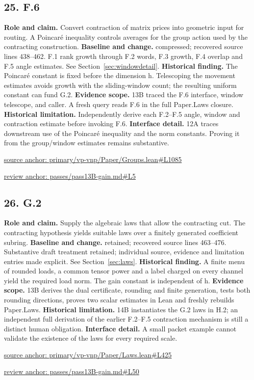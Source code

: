 \documentclass[11pt,letterpaper]{article}
\theoremstyle{definition}\newtheorem{definition}[theorem]{Definition}\newtheorem{example}[theorem]{Example}
\theoremstyle{remark}\newtheorem{remark}[theorem]{Remark}
\begin{document}
\subsection*{25. F.6}
\textbf{Role and claim.} Convert contraction of matrix prices into geometric input for routing. A Poincaré inequality controls averages for the group action used by the contracting construction.
\textbf{Baseline and change.} compressed; recovered source lines 438--462. F.1 rank growth through F.2 words, F.3 growth, F.4 overlap and F.5 angle estimates. See Section~\ref{sec:windowdetail}.
\textbf{Historical finding.} The Poincaré constant is fixed before the dimension h. Telescoping the movement estimates avoids growth with the sliding-window count; the resulting uniform constant can fund G.2.
\textbf{Evidence scope.} 13B traced the F.6 interface, window telescope, and caller. A fresh query reads F.6 in the full Paper.Laws closure.
\textbf{Historical limitation.} Independently derive each F.2–F.5 angle, window and contraction estimate before invoking F.6.
\textbf{Interface detail.} 12A traces downstream use of the Poincaré inequality and the norm constants. Proving it from the group/window estimates remains substantive.
\par\href{https://github.com/nousentllc/VP-VNP-Review/blob/8a7976933b6b2b4ffda1ad3a0dfb5fc6b6f023e8/primary/vp-vnp/Paper/Groups.lean\#L1085}{source anchor: primary/vp-vnp/Paper/Groups.lean\#L1085}
\par\href{https://github.com/nousentllc/VP-VNP-Review/blob/8a7976933b6b2b4ffda1ad3a0dfb5fc6b6f023e8/passes/pass13B-gain.md\#L5}{review anchor: passes/pass13B-gain.md\#L5}
\goodbreak
\subsection*{26. G.2}
\textbf{Role and claim.} Supply the algebraic laws that allow the contracting cut. The contracting hypothesis yields suitable laws over a finitely generated coefficient subring.
\textbf{Baseline and change.} retained; recovered source lines 463--476. Substantive draft treatment retained; individual source, evidence and limitation entries made explicit. See Section~\ref{sec:laws}.
\textbf{Historical finding.} A finite menu of rounded loads, a common tensor power and a label charged on every channel yield the required load norm. The gain constant is independent of h.
\textbf{Evidence scope.} 13B derives the dual certificate, rounding and finite generation, tests both rounding directions, proves two scalar estimates in Lean and freshly rebuilds Paper.Laws.
\textbf{Historical limitation.} 14B instantiates the G.2 laws in H.2; an independent full derivation of the earlier F.2–F.5 contraction mechanism is still a distinct human obligation.
\textbf{Interface detail.} A small packet example cannot validate the existence of the laws for every required scale.
\par\href{https://github.com/nousentllc/VP-VNP-Review/blob/8a7976933b6b2b4ffda1ad3a0dfb5fc6b6f023e8/primary/vp-vnp/Paper/Laws.lean\#L425}{source anchor: primary/vp-vnp/Paper/Laws.lean\#L425}
\par\href{https://github.com/nousentllc/VP-VNP-Review/blob/8a7976933b6b2b4ffda1ad3a0dfb5fc6b6f023e8/passes/pass13B-gain.md\#L50}{review anchor: passes/pass13B-gain.md\#L50}
\goodbreak
\end{document}
